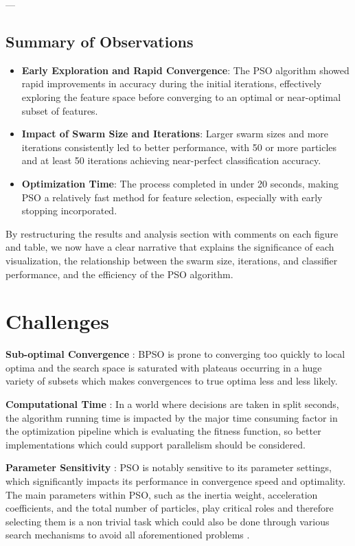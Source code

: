 \documentclass[12pt]{article}
\begin{document}
---

\subsection{Summary of Observations}

\begin{itemize}
    \item \textbf{Early Exploration and Rapid Convergence}: The PSO algorithm showed rapid improvements in accuracy during the initial iterations, effectively exploring the feature space before converging to an optimal or near-optimal subset of features.
    \item \textbf{Impact of Swarm Size and Iterations}: Larger swarm sizes and more iterations consistently led to better performance, with 50 or more particles and at least 50 iterations achieving near-perfect classification accuracy.
    \item \textbf{Optimization Time}: The process completed in under 20 seconds, making PSO a relatively fast method for feature selection, especially with early stopping incorporated.
\end{itemize}

By restructuring the results and analysis section with comments on each figure and table, we now have a clear narrative that explains the significance of each visualization, the relationship between the swarm size, iterations, and classifier performance, and the efficiency of the PSO algorithm.



\section{Challenges}
\textbf{Sub-optimal Convergence} : BPSO is prone to converging too quickly to local optima and the search space is saturated with plateaus occurring in a huge variety of subsets which makes convergences to true optima less and less likely.

\textbf{Computational Time} : In a world where decisions are taken in split seconds, the algorithm running time is impacted by the major time consuming factor in the optimization pipeline which is evaluating the fitness function, so better implementations which could support parallelism should be considered.

\textbf{Parameter Sensitivity} : PSO is notably sensitive to its parameter settings, which significantly impacts its performance in convergence speed and optimality. The main parameters within PSO, such as the inertia weight, acceleration coefficients, and the total number of particles, play critical roles and therefore selecting them is a non trivial task which could also be done through various search mechanisms to avoid all aforementioned problems \cite{mostafa2022convergencepso}.
\end{document}
